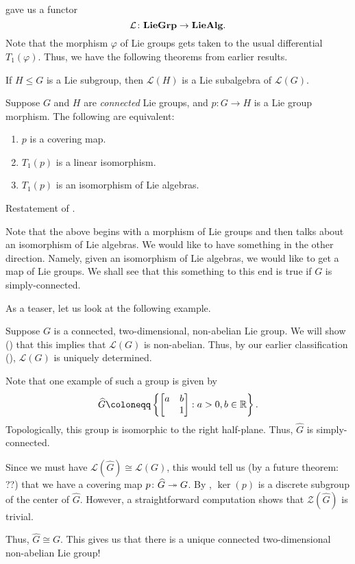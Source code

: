 \documentclass[12pt]{article}
\begin{document}
 gave us a functor
\begin{equation*} 
	\mathcal{L} \colon \mathbf{LieGrp} \to \mathbf{LieAlg}.
\end{equation*}
Note that the morphism $\varphi$ of Lie groups gets taken to the usual differential $T_{1}(\varphi)$. 
Thus, we have the following theorems from earlier results.

\begin{thm}
	If $H \le G$ is a Lie subgroup, then $\mathcal{L}(H)$ is a Lie subalgebra of $\mathcal{L}(G)$.
\end{thm}

\begin{thm}
	Suppose $G$ and $H$ are \emph{connected} Lie groups, and $p \colon G \to H$ is a Lie group morphism. The following are equivalent:
	\begin{enumerate}[label=(\alph*)]
		\item $p$ is a covering map.
		\item $T_{1}(p)$ is a linear isomorphism.
		\item $T_{1}(p)$ is an isomorphism of Lie algebras.
	\end{enumerate}
\end{thm}
\begin{sketch}
	Restatement of .
\end{sketch}

Note that the above begins with a morphism of Lie groups and then talks about an isomorphism of Lie algebras. 
We would like to have something in the other direction. 
Namely, given an isomorphism of Lie algebras, we would like to get a map of Lie groups. 
We shall see that this something to this end is true if $G$ is simply-connected.

As a teaser, let us look at the following example.
\begin{ex}
	Suppose $G$ is a connected, two-dimensional, non-abelian Lie group. 
	We will show () that this implies that $\mathcal{L}(G)$ is non-abelian. 
	Thus, by our earlier classification (), $\mathcal{L}(G)$ is uniquely determined. 

	Note that one example of such a group is given by
	\begin{equation*} 
		\widehat{G} \coloneqq \left\{\two{a}{b}{}{1} : a > 0, b \in \mathbb{R}\right\}.
	\end{equation*}
	Topologically, this group is isomorphic to the right half-plane. 
	Thus, $\widehat{G}$ is simply-connected.

	Since we must have $\mathcal{L}(\widehat{G}) \cong \mathcal{L}(G)$, this would tell us (by a future theorem: ??) that we have a covering map $p \colon \widehat{G} \twoheadrightarrow G$. 
	By , $\ker(p)$ is a discrete subgroup of the center of $\widehat{G}$. 
	However, a straightforward computation shows that $\mathcal{Z}(\widehat{G})$ is trivial. 

	Thus, $\widehat{G} \cong G$. This gives us that there is a unique connected two-dimensional non-abelian Lie group!
\end{ex}
\end{document}
